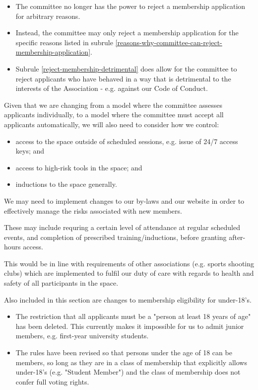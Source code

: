 \documentclass[../constitution.tex]{subfiles}
\begin{document}
\begin{itemize}
    \item The committee no longer has the power to reject a membership application for arbitrary reasons.
    \item Instead, the committee may only reject a membership application for the specific reasons listed in subrule \ref{reasons-why-committee-can-reject-membership-application}.
    \item Subrule \ref{reject-membership-detrimental} does allow for the committee to reject applicants who have behaved in a way that is detrimental to the interests of the Association - e.g. against our Code of Conduct.
\end{itemize}

\bigskip

Given that we are changing from a model where the committee assesses applicants individually, to a model where the committee must accept all applicants automatically, we will also need to consider how we control:

\begin{itemize}
    \item access to the space outside of scheduled sessions, e.g. issue of 24/7 access keys; and
    \item access to high-risk tools in the space; and
    \item inductions to the space generally.
\end{itemize}

\bigskip

We may need to implement changes to our by-laws and our website in order to effectively manage the risks associated with new members.

These may include requring a certain level of attendance at regular scheduled events, and completion of prescribed training/inductions, before granting after-hours access.

This would be in line with requirements of other associations (e.g. sports shooting clubs) which are implemented to fulfil our duty of care with regards to health and safety of all participants in the space.

\bigskip

Also included in this section are changes to membership eligibility for under-18's.

\begin{itemize}
    \item The restriction that all applicants must be a "person at least 18 years of age" has been deleted. This currently makes it impossible for us to admit junior members, e.g. first-year university students.

    \item The rules have been revised so that persons under the age of 18 can be members, so long as they are in a class of membership that explicitly allows under-18's (e.g. "Student Member") and the class of membership does not confer full voting rights.
\end{itemize}
\end{document}
